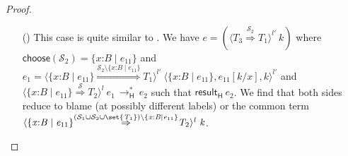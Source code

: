 \documentclass[9pt]{extarticle}
\newcommand{\ottnt}[1]{\mathit{#1}}
\newcommand{\ottsym}[1]{#1}
\begin{document}
{\begin{lemma}
\begin{proof}
{\begin{itemize}
    \item[(\E{CheckSet})] This case is quite similar to .
We have $\ottnt{e}  \ottsym{=}   (  \langle  \ottnt{T_{{\mathrm{3}}}}  \mathord{ \overset{ \mathcal{S}_{{\mathrm{2}}} }{\Rightarrow} }  \ottnt{T_{{\mathrm{1}}}}  \rangle^{ \ottnt{l'} } ~  \ottnt{k}  ) $ where $ \mathsf{choose} ( \mathcal{S}_{{\mathrm{2}}} )   \ottsym{=}   \{ \mathit{x} \mathord{:} \ottnt{B} \mathrel{\mid} \ottnt{e_{{\mathrm{11}}}} \} $ and $\ottnt{e_{{\mathrm{1}}}}  \ottsym{=}   \langle   \{ \mathit{x} \mathord{:} \ottnt{B} \mathrel{\mid} \ottnt{e_{{\mathrm{11}}}} \}   \mathord{ \overset{  \mathcal{S}_{{\mathrm{2}}}  \setminus   \{ \mathit{x} \mathord{:} \ottnt{B} \mathrel{\mid} \ottnt{e_{{\mathrm{11}}}} \}   }{\Rightarrow} }  \ottnt{T_{{\mathrm{1}}}}  \rangle^{ \ottnt{l'} } ~   \langle   \{ \mathit{x} \mathord{:} \ottnt{B} \mathrel{\mid} \ottnt{e_{{\mathrm{11}}}} \}  ,   \ottnt{e_{{\mathrm{11}}}}  [  \ottnt{k} / \mathit{x}  ]  ,  \ottnt{k}  \rangle^{ \ottnt{l'} }  $ and $ \langle   \{ \mathit{x} \mathord{:} \ottnt{B} \mathrel{\mid} \ottnt{e_{{\mathrm{11}}}} \}   \mathord{ \overset{ \mathcal{S} }{\Rightarrow} }  \ottnt{T_{{\mathrm{2}}}}  \rangle^{ \ottnt{l} } ~  \ottnt{e_{{\mathrm{1}}}}  \,  \longrightarrow ^{*}_{  \mathsf{H}  }  \, \ottnt{e_{{\mathrm{2}}}}$ such that $ \mathsf{result} _{  \mathsf{H}  }~ \ottnt{e_{{\mathrm{2}}}} $.
We find that both sides reduce to blame (at possibly
      different labels) or the common term $ \langle   \{ \mathit{x} \mathord{:} \ottnt{B} \mathrel{\mid} \ottnt{e_{{\mathrm{11}}}} \}   \mathord{ \overset{  \ottsym{(}    \mathcal{S}_{{\mathrm{1}}}  \cup  \mathcal{S}_{{\mathrm{2}}}   \cup   \set{  \ottnt{T_{{\mathrm{1}}}}  }    \ottsym{)}  \setminus   \{ \mathit{x} \mathord{:} \ottnt{B} \mathrel{\mid} \ottnt{e_{{\mathrm{11}}}} \}   }{\Rightarrow} }  \ottnt{T_{{\mathrm{2}}}}  \rangle^{ \ottnt{l} } ~  \ottnt{k} $.
      

\end{itemize}}
\end{proof}
\end{lemma}}
\end{document}
